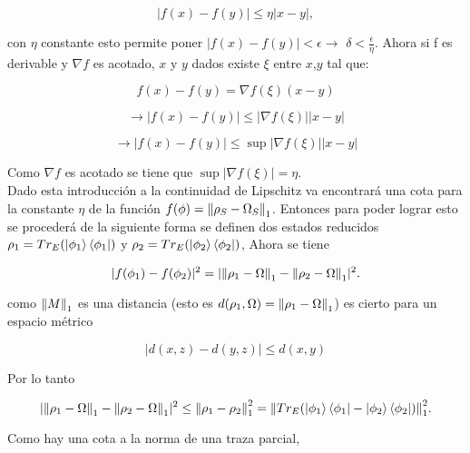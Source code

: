 \begin{equation}
|f(x) -f(y)| \le \eta |x-y|,
\end{equation}

 con $\eta$ constante esto permite poner $|f(x)-f(y)| < \epsilon \to $ $\delta < \frac{\epsilon}{\eta} $. Ahora si f es derivable y $\nabla f$ es acotado, $x$ y $y$ dados existe $\xi$ entre $x$,$y$ tal que:
 
\begin{equation}
f(x)-f(y)= \nabla f(\xi) (x-y)
\end{equation}

\begin{equation}
\to |f(x)- f(y)| \le |\nabla f(\xi)| |x-y|
\end{equation}

\begin{equation}
\to |f(x)- f(y)| \le \sup|\nabla f(\xi)| |x-y|
\end{equation}
 
Como $\nabla f$ es acotado se tiene que $\sup |\nabla f(\xi)|=\eta$.\\

Dado esta introducción a la continuidad de Lipschitz va encontrará una cota para la constante $\eta$ de la función $f(\phi)=\norm{\rho_{S}-\Omega_{S}}_{1}$. Entonces para poder lograr esto se procederá de la siguiente forma se definen dos estados reducidos $\rho_{1}= Tr_{E} (\ket{\phi_{1}} \bra{\phi_{1}})$ y $\rho_{2}=Tr_{E}(\ket{\phi_{2}} \bra{\phi_{2}})$, Ahora se tiene

\begin{equation}
|f(\phi_{1})-f(\phi_{2})|^2= |\norm{\rho_{1}-\Omega}_{1} - \norm{\rho_{2}-\Omega}_{1}|^2.
\end{equation}

como $\norm{M}_{1}$ es una distancia (esto es $d(\rho_{1},\Omega)= \norm{\rho_{1}-\Omega}_{1}$) es cierto para un espacio métrico

\begin{equation}
|d(x,z)-d(y,z)| \le d(x,y)
\end{equation}

Por lo tanto 

\begin{equation}
|\norm{\rho_{1}-\Omega}_{1} - \norm{\rho_{2}-\Omega}_{1}|^2 \le \norm{\rho_{1}- \rho_{2} }_{1}^2=\norm{Tr_{E}(\ket{\phi_{1}} \bra{\phi_{1}}-\ket{\phi_{2}} \bra{\phi_{2}})}_{1}^{2}.
\end{equation}

Como hay una cota a la norma de una traza parcial,

